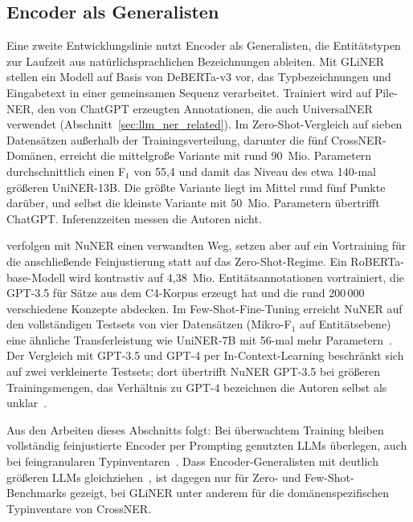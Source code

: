 \subsection{Encoder als Generalisten}
\label{sec:k3-encoder-generalisten}

Eine zweite Entwicklungslinie nutzt Encoder als Generalisten, die
Entitätstypen zur Laufzeit aus natürlichsprachlichen Bezeichnungen
ableiten.
Mit GLiNER stellen \textcite{zaratiana2024gliner} ein Modell auf Basis
von DeBERTa-v3 vor, das Typbezeichnungen und Eingabetext in einer
gemeinsamen Sequenz verarbeitet.
Trainiert wird auf Pile-NER, den von ChatGPT erzeugten Annotationen, die
auch UniversalNER verwendet (Abschnitt~\ref{sec:llm_ner_related}).
Im Zero-Shot-Vergleich auf sieben Datensätzen außerhalb der
Trainingsverteilung, darunter die fünf CrossNER-Domänen, erreicht die
mittelgroße Variante mit rund 90~Mio. Parametern durchschnittlich einen F$_1$ von
55{,}4 und damit das Niveau des etwa 140-mal größeren UniNER-13B.
Die größte Variante liegt im Mittel rund fünf Punkte darüber, und selbst
die kleinste Variante mit 50~Mio. Parametern übertrifft ChatGPT.
Inferenzzeiten messen die Autoren nicht.

\textcite{bogdanov2024nuner} verfolgen mit NuNER einen verwandten Weg,
setzen aber auf ein Vortraining für die anschließende Feinjustierung
statt auf das Zero-Shot-Regime.
Ein RoBERTa-base-Modell wird kontrastiv auf 4{,}38~Mio.
Entitätsannotationen vortrainiert, die GPT-3.5 für Sätze aus dem
C4-Korpus erzeugt hat und die rund 200\,000 verschiedene Konzepte
abdecken.
Im Few-Shot-Fine-Tuning erreicht NuNER auf den vollständigen Testsets
von vier Datensätzen (Mikro-F$_1$ auf Entitätsebene) eine ähnliche
Transferleistung wie UniNER-7B mit 56-mal mehr
Parametern~\cite[Tab.~2]{bogdanov2024nuner}.
Der Vergleich mit GPT-3.5 und GPT-4 per In-Context-Learning beschränkt
sich auf zwei verkleinerte Testsets; dort übertrifft NuNER GPT-3.5 bei
größeren Trainingsmengen, das Verhältnis zu GPT-4 bezeichnen die Autoren
selbst als unklar~\cite[Abschn.~6]{bogdanov2024nuner}.

Aus den Arbeiten dieses Abschnitts folgt: Bei überwachtem Training
bleiben vollständig feinjustierte Encoder per Prompting genutzten LLMs
überlegen, auch bei feingranularen
Typinventaren~\cite{tan2023damo,keraghel2024recent}.
Dass Encoder-Generalisten mit deutlich größeren LLMs
gleichziehen~\cite{zaratiana2024gliner,bogdanov2024nuner}, ist dagegen
nur für Zero- und Few-Shot-Benchmarks gezeigt, bei GLiNER unter anderem
für die domänenspezifischen Typinventare von CrossNER.

